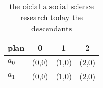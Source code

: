 \documentclass[a4paper]{article}
\begin{document}
\begin{table}
\begin{adjustbox}{width=0.6\columnwidth}
\begin{tabular}{|l|l|l|l|}
\hline
\textbf{plan} & \multicolumn{1}{c|}{\textbf{0}} & \multicolumn{1}{c|}{\textbf{1}} & \multicolumn{1}{c|}{\textbf{2}} \\ \hline
\textbf{$a_0$}  & (0,0) & (1,0) & (2,0) \\ \hline
\textbf{$a_1$}  & (0,0) & (1,0) & (2,0) \\ \hline
\end{tabular}
\end{adjustbox}
\caption{the oicial a social science research today the descendants 
}
\end{table}
\end{document}
